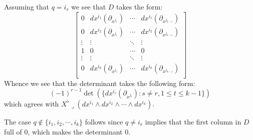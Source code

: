 {Assuming that $q=i_r$ we see that $D$ takes the form: 
$$\begin{bmatrix}
0 & dx^{i_1}(\partial_{x^{j_1}}) & \cdots & dx^{i_1}(\partial_{x^{j_{k-1}}}) \\ 
0 & dx^{i_2}(\partial_{x^{j_1}}) & \cdots & dx^{i_2}(\partial_{x^{j_{k-1}}}) \\
\vdots & \vdots & \ddots & \vdots \\
1 & 0 & \cdots & 0 \\ 
\vdots & \vdots & \ddots & \vdots \\ 
0 & dx^{i_k}(\partial_{x^{j_1}}) & \cdots & dx^{i_k}(\partial_{x^{j_{k-1}}}) \\ 
\end{bmatrix} $$
Whence we see that the determinant takes the following form: $$(-1)^{r-1} \det(\{ dx^{i_s}(\partial_{x^{j_t}}): s\neq r, 1\leq t\leq k-1 \}) $$ which agrees with $X^{\flat}\lrcorner (dx^{i_1}\wedge dx^{i_2}\wedge \cdots \wedge dx^{i_k})$.

The case $q\not\in \{i_1,i_2,\cdots,i_k\}$ follows since $q\neq i_r$ implies that the first column in $D$ full of $0$, which makes the determinant $0$. 

}



